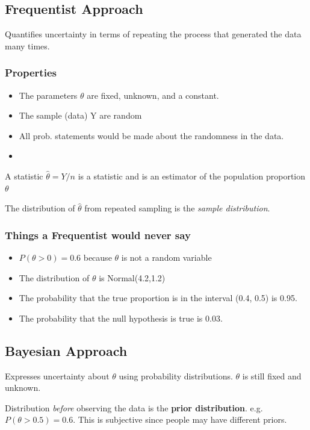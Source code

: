 \documentclass[11pt]{article}
\begin{document}
\subsection{Frequentist Approach}
\label{sec:org5e6425a}

Quantifies uncertainty in terms of repeating the process that generated the data
many times.

\subsubsection{Properties}
\label{sec:org72cb496}
\begin{itemize}
\item The parameters \(\theta\) are fixed, unknown, and a constant.
\item The sample (data) Y are random
\item All prob. statements would be made about the randomness in the data.
\item 
\end{itemize}

A statistic \(\hat \theta = Y / n\) is a statistic and is an estimator of the
population proportion \(\theta\)

The distribution of \(\hat \theta\) from repeated sampling is the \emph{sample distribution}.
\subsubsection{Things a Frequentist would never say}
\label{sec:org8393a2b}
\begin{itemize}
\item \(P(\theta > 0) = 0.6\) because \(\theta\) is not a random variable
\item The distribution of \(\theta\) is Normal(4.2,1.2)
\item The probability that the true proportion is in the interval (0.4, 0.5) is
0.95.
\item The probability that the null hypothesis is true is 0.03.
\end{itemize}


\subsection{Bayesian Approach}
\label{sec:orgf6be91e}

Expresses uncertainty about \(\theta\) using probability distributions. \(\theta\)
is still fixed and unknown.

Distribution \emph{before} observing the data is the \textbf{prior distribution}. e.g.
\(P(\theta > 0.5) = 0.6\). This is subjective since people may have different priors.
\end{document}
